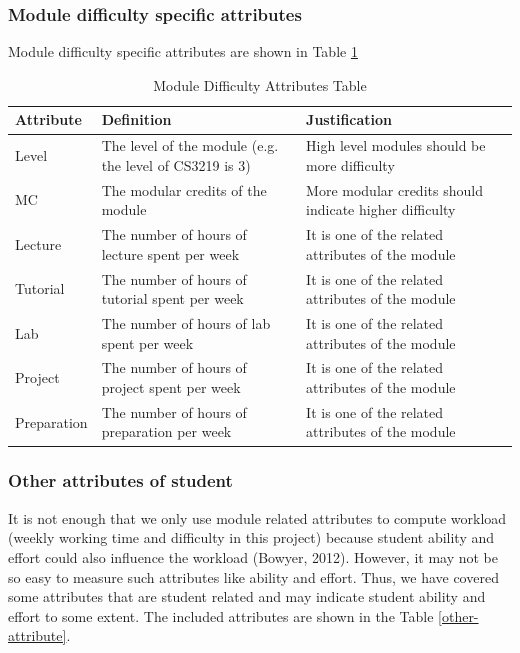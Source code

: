 \documentclass[fyp]{socreport}
\begin{document}
\subsubsection{Module difficulty specific attributes}
Module difficulty specific attributes are shown in Table {\ref{difficulty-attribute}}
\begin{table}[]
\centering
\begin{tabular}{|p{}|p{}|p{}|}
\hline
	\rowcolor[HTML]{C0C0C0}
	\textbf{Attribute} & \textbf{Definition} & \textbf{Justification} \\
\hline
Level & The level of the module (e.g. the level of CS3219 is 3) & High level modules should be more difficulty \\
\hline
MC & The modular credits of the module & More modular credits should indicate higher difficulty \\
\hline
Lecture & The number of hours of lecture spent per week & It is one of the related attributes of the module \\
\hline
Tutorial & The number of hours of tutorial spent per week & It is one of the related attributes of the module \\
\hline
Lab & The number of hours of lab spent per week & It is one of the related attributes of the module \\
\hline
Project & The number of hours of project spent per week & It is one of the related attributes of the module \\
\hline
Preparation & The number of hours of preparation per week & It is one of the related attributes of the module \\
\hline
\end{tabular}
\caption{Module Difficulty Attributes Table}
\label{difficulty-attribute}
\end{table}

\subsubsection{Other attributes of student}
It is not enough that we only use module related attributes to compute workload (weekly working time and difficulty in this project) because student ability and effort could also influence the workload (Bowyer, 2012). However, it may not be so easy to measure such attributes like ability and effort. Thus, we have covered some attributes that are student related and may indicate student ability and effort to some extent. The included attributes are shown in the Table {\ref{other-attribute}}.
\end{document}
